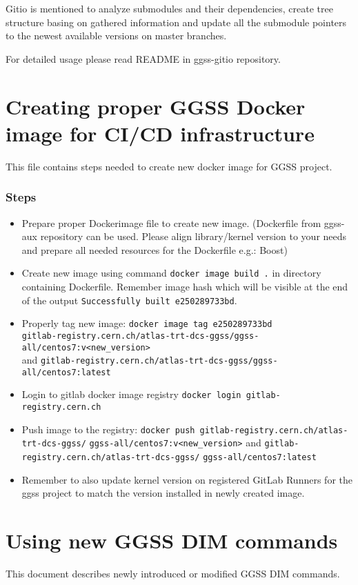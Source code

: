 Gitio is mentioned to analyze submodules and their dependencies, create tree structure basing on gathered information and update all the submodule pointers to the newest available versions on master branches.

For detailed usage please read README in ggss-gitio repository.

\clearpage
\section{Creating proper GGSS Docker image for CI/CD infrastructure}
This file contains steps needed to create new docker image for GGSS project.

\subsubsection*{Steps}
\begin{itemize}
    \item Prepare proper Dockerimage file to create new image. (Dockerfile from ggss-aux repository can be used. Please align library/kernel version to your needs and prepare all needed resources for the Dockerfile e.g.: Boost)
    \item Create new image using command \lstinline{docker image build .} in directory containing Dockerfile. Remember image hash which will be visible at the end of the output \lstinline{Successfully built e250289733bd}.
    \item Properly tag new image:
    \lstinline{docker image tag e250289733bd} \\
    \lstinline{gitlab-registry.cern.ch/atlas-trt-dcs-ggss/ggss-all/centos7:v<new_version>} \\ 
    and \lstinline{gitlab-registry.cern.ch/atlas-trt-dcs-ggss/ggss-all/centos7:latest}
    \item Login to gitlab docker image registry \lstinline{docker login gitlab-registry.cern.ch}
    \item Push image to the registry: \lstinline{docker push gitlab-registry.cern.ch/atlas-trt-dcs-ggss/} \lstinline{ggss-all/centos7:v<new_version>} and \lstinline{gitlab-registry.cern.ch/atlas-trt-dcs-ggss/} \lstinline{ggss-all/centos7:latest}
    \item Remember to also update kernel version on registered GitLab Runners for the ggss project to match the version installed in newly created image.
\end{itemize}

\clearpage
\section{Using new GGSS DIM commands}
This document describes newly introduced or modified GGSS DIM commands.

